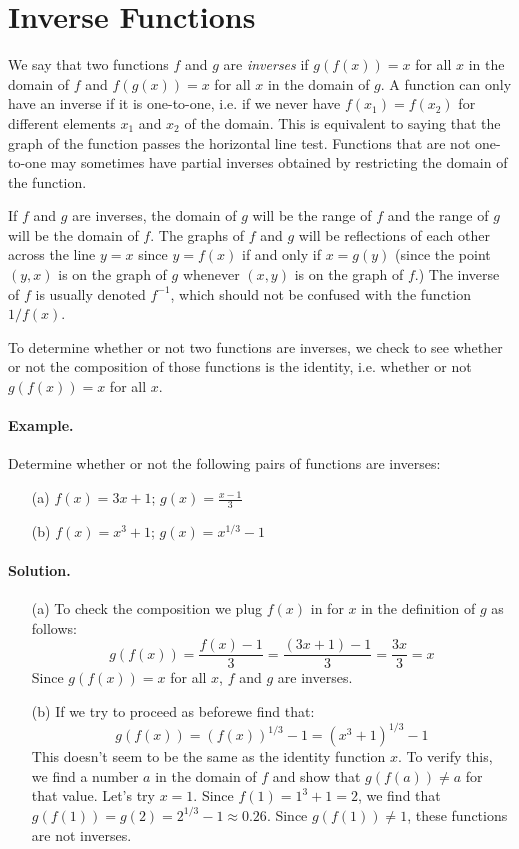 \documentclass[12pt]{report}
\begin{document}
\section{Inverse Functions}

We say that two functions $f$ and $g$ are \emph{inverses} if $g(f(x))=x$ for all $x$ in the domain of $f$ and $f(g(x))=x$ for all $x$ in the domain of $g$. A function can only have an inverse if it is one-to-one, i.e. if we never have $f(x_1)=f(x_2)$ for different elements $x_1$ and $x_2$ of the domain. This is equivalent to saying that the graph of the function passes the horizontal line test. Functions that are not one-to-one may sometimes have partial inverses obtained by restricting the domain of the function.

If $f$ and $g$ are inverses, the domain of $g$ will be the range of $f$ and the range of $g$ will be the domain of $f$. The graphs of $f$ and $g$ will be reflections of each other across the line $y=x$ since $y=f(x)$ if and only if $x=g(y)$ (since the point $(y,x)$ is on the graph of $g$ whenever $(x,y)$ is on the graph of $f$.)  The inverse of $f$ is usually denoted $f^{-1}$, which should not be confused with the function $1/f(x)$.

To determine whether or not two functions are inverses, we check to see whether or not the composition of those functions is the identity, i.e. whether or not $g(f(x))=x$ for all $x$. 

\paragraph{Example.} Determine whether or not the following pairs of functions are inverses:
\begin{itemize}
\item[(a)] $f(x)=3x+1$; $\displaystyle g(x)=\frac{x-1}3$
\item [(b)]$f(x)=x^3+1$; $g(x)=x^{1/3}-1$
\end{itemize}

\paragraph{Solution.}
\begin{itemize}
\item [(a)] To check the composition we plug $f(x)$ in for $x$ in the definition of $g$ as follows: \[ g(f(x))=\frac{f(x)-1}3=\frac{(3x+1)-1}3=\frac{3x}3=x\] Since $g(f(x))=x$ for all $x$, $f$ and $g$ are inverses.
\item [(b)] If we try to proceed as beforewe find that: \[ g(f(x))=(f(x))^{1/3}-1 =(x^3+1)^{1/3}-1\] This doesn't seem to be the same as the identity function $x$. To verify this, we find a number $a$ in the domain of $f$ and show that $g(f(a))\neq a$ for that value. Let's try $x=1$. Since $f(1)=1^3+1=2$, we find that $g(f(1))=g(2)=2^{1/3}-1\approx 0.26$. Since $g(f(1))\neq 1$, these functions are not inverses.
\end{itemize}
\end{document}
